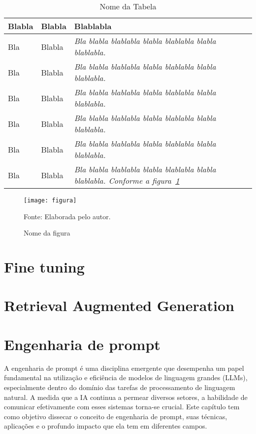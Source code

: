 \documentclass[tcc,capa]{texufpel}
\begin{document}
\begin{table}
  \begin{center}
    \caption{Nome da Tabela}\label{tabela2}
    \begin{tabular}{p{4cm}p{5cm}p{6cm}}
      \hline
      Blabla & Blabla & Blablabla\\
      \hline
      {\small Bla} & {\small Blabla} & {\small\em Bla blabla blablabla blabla
                                       blablabla blabla blablabla.}\\
      {\small Bla} & {\small Blabla} & {\small\em Bla blabla blablabla blabla
                                       blablabla blabla blablabla.}\\
      {\small Bla} & {\small Blabla} & {\small\em Bla blabla blablabla blabla
                                       blablabla blabla blablabla.}\\
      {\small Bla} & {\small Blabla} & {\small\em Bla blabla blablabla blabla
                                       blablabla blabla blablabla.}\\
      {\small Bla} & {\small Blabla} & {\small\em Bla blabla blablabla blabla
                                       blablabla blabla blablabla.}\\
      {\small Bla} & {\small Blabla} & {\small\em Bla blabla blablabla blabla
                                       blablabla blabla blablabla. Conforme a figura~\ref{figura}}\\
      \hline
    \end{tabular}
  \end{center}
\end{table}

\begin{figure}[htbp]
\caption{Nome da figura}   
\centering \texttt{[image: figura]}\\
\begin{flushleft}
{\small Fonte: Elaborada pelo autor.}    
\end{flushleft}
\label{figura}
\end{figure}


\section{Fine tuning}
\section{Retrieval Augmented Generation}
\section{Engenharia de prompt}
A engenharia de prompt é uma disciplina emergente que desempenha um papel fundamental na utilização e eficiência de modelos de linguagem grandes (LLMs), especialmente dentro do domínio das tarefas de processamento de linguagem natural. A medida que a IA continua a permear diversos setores, a habilidade de comunicar efetivamente com esses sistemas torna-se crucial. Este capítulo tem como objetivo dissecar o conceito de engenharia de prompt, suas técnicas, aplicações e o profundo impacto que ela tem em diferentes campos.
\end{document}
